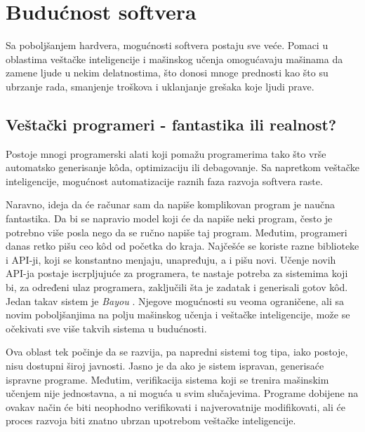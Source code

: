 \documentclass[a4paper]{article}
\begin{document}
\section{Budućnost softvera}
\label{sec:buducnost}

Sa poboljšanjem hardvera, mogućnosti softvera postaju sve veće. Pomaci u oblastima veštačke inteligencije i mašinskog učenja omogućavaju mašinama da zamene ljude u nekim delatnostima, što donosi mnoge prednosti kao što su ubrzanje rada, smanjenje troškova i uklanjanje grešaka koje ljudi prave.

\subsection{Veštački programeri - fantastika ili realnost?}
Postoje mnogi programerski alati koji pomažu programerima tako što vrše automatsko generisanje k\^{o}da, optimizaciju  ili debagovanje.
Sa napretkom veštačke inteligencije, mogućnost automatizacije raznih faza razvoja softvera raste.

Naravno, ideja da će računar sam da napiše komplikovan program je naučna fantastika. Da bi se napravio model koji će da napiše neki program, često je potrebno više posla nego da se ručno napiše taj program. Međutim, programeri danas retko pišu ceo k\^{o}d od početka do kraja. Najčešće se koriste razne biblioteke i API-ji, koji se konstantno menjaju, unapređuju, a i pišu novi. Učenje novih API-ja postaje iscrpljujuće za programera, te nastaje potreba za sistemima koji bi, za određeni ulaz programera, zaključili šta je zadatak i generisali gotov k\^{o}d. Jedan takav sistem je \emph{Bayou} \cite{bayou}. Njegove mogućnosti su veoma ograničene, ali sa novim poboljšanjima na polju mašinskog učenja i veštačke inteligencije, može se očekivati sve više takvih sistema u budućnosti.

Ova oblast tek počinje da se razvija, pa napredni sistemi tog tipa, iako postoje, nisu dostupni široj javnosti. Jasno je da ako je sistem ispravan, generisaće ispravne programe. Međutim, verifikacija sistema koji se trenira mašinskim učenjem nije jednostavna, a ni moguća u svim slučajevima. Programe dobijene na ovakav način će biti neophodno verifikovati i najverovatnije modifikovati, ali će proces razvoja biti znatno ubrzan upotrebom veštačke inteligencije. 
\end{document}
